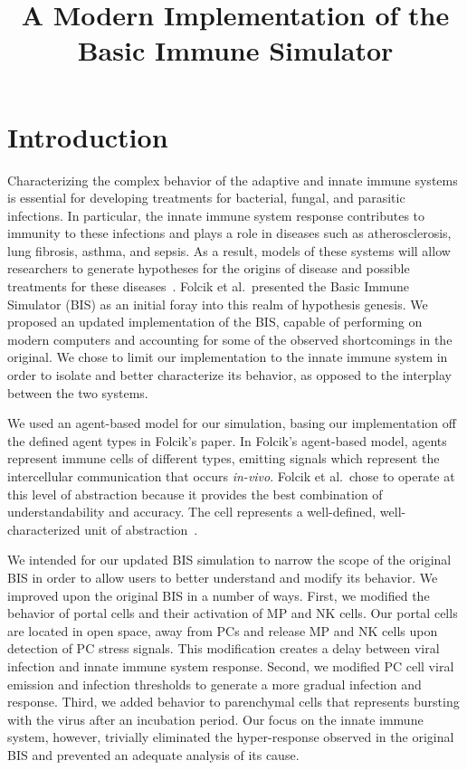 \documentclass[10pt,conference]{IEEEtran}
\begin{document}
\title{A Modern Implementation of the \\
Basic Immune Simulator}

\author{
}

\maketitle
\thispagestyle{plain}
\pagestyle{plain}

\section{Introduction}
\noindent
Characterizing the complex behavior of the adaptive and innate immune systems
is essential for developing treatments for bacterial, fungal, and parasitic
infections. In particular, the innate immune system response contributes to
immunity to these infections and plays a role in diseases such as
atherosclerosis, lung fibrosis, asthma, and sepsis. As a result, models of
these systems will allow researchers to generate hypotheses for the origins of
disease and possible treatments for these diseases~\cite{Folcik:2007}. Folcik
et al.\ presented the Basic Immune Simulator (BIS) as an initial foray into
this realm of hypothesis genesis. We proposed an updated implementation of the
BIS, capable of performing on modern computers and accounting for some of the
observed shortcomings in the original.  We chose to limit our implementation to
the innate immune system in order to isolate and better characterize its
behavior, as opposed to the interplay between the two systems.

\indent
We used an agent-based model for our simulation, basing our implementation off
the defined agent types in Folcik's paper. In Folcik's agent-based model,
agents represent immune cells of different types, emitting signals which
represent the intercellular communication that occurs \textit{in-vivo}. Folcik
et al.\ chose to operate at this level of abstraction because it provides the
best combination of understandability and accuracy. The cell represents a
well-defined, well-characterized unit of abstraction~\cite{Folcik:2007}.

\indent
We intended for our updated BIS simulation to narrow the scope of the original
BIS in order to allow users to better understand and modify its behavior. We
improved upon the original BIS in a number of ways. First, we modified the
behavior of portal cells and their activation of MP and NK cells. Our portal
cells are located in open space, away from PCs and release MP and NK cells upon
detection of PC stress signals. This modification creates a delay between
viral infection and innate immune system response. Second, we modified PC cell
viral emission and infection thresholds to generate a more gradual infection
and response. Third, we added behavior to parenchymal cells that represents
bursting with the virus after an incubation period. Our focus on the innate
immune system, however, trivially eliminated the hyper-response observed in the
original BIS and prevented an adequate analysis of its cause.
\end{document}
